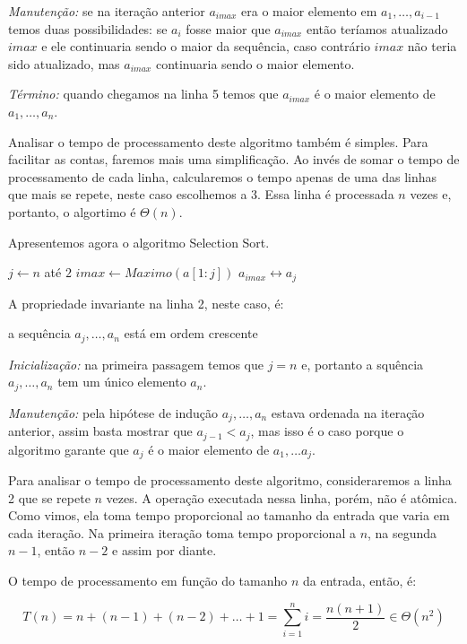   {\em Manutenção:} se na iteração anterior $a_{imax}$ era o maior elemento em $a_1, \dots, a_{i-1}$ temos duas possibilidades: se $a_i$ fosse maior que $a_{imax}$ então teríamos atualizado $imax$ e ele continuaria sendo o maior da sequência, caso contrário $imax$ não teria sido atualizado, mas $a_{imax}$ continuaria sendo o maior elemento.

  {\em Término:} quando chegamos na linha 5 temos que $a_{imax}$ é o maior elemento de $a_1, \dots, a_n$.

  Analisar o tempo de processamento deste algoritmo também é simples.
  Para facilitar as contas, faremos mais uma simplificação.
  Ao invés de somar o tempo de processamento de cada linha, calcularemos o tempo apenas de uma das linhas que mais se repete, neste caso escolhemos a 3.
  Essa linha é processada $n$ vezes e, portanto, o algortimo é $\Theta(n)$.

  Apresentemos agora o algoritmo Selection Sort.

  
  \begin{codebox}
\li \For $j \gets n$ até $2$
\li \Do $imax \gets Maximo(a[1:j])$
\li     \Then $a_{imax} \leftrightarrow a_j$
        \End
    \End
\End
  \end{codebox}

  A propriedade invariante na linha 2, neste caso, é:
  \begin{center}
    a sequência $a_j, \dots, a_n$ está em ordem crescente
  \end{center}

  {\em Inicialização:} na primeira passagem temos que $j=n$ e, portanto a squência $a_j, \dots, a_n$ tem um único elemento $a_n$.

  {\em Manutenção:} pela hipótese de indução $a_j, \dots, a_n$ estava ordenada na iteração anterior, assim basta mostrar que $a_{j-1} < a_j$, mas isso é o caso porque o algoritmo garante que $a_j$ é o maior elemento de $a_1, \dots a_j$.
  

  Para analisar o tempo de processamento deste algoritmo, consideraremos a linha 2 que se repete $n$ vezes.
  A operação executada nessa linha, porém, não é atômica.
  Como vimos, ela toma tempo proporcional ao tamanho da entrada que varia em cada iteração.
  Na primeira iteração toma tempo proporcional a $n$, na segunda $n-1$, então $n-2$ e assim por diante.

  O tempo de processamento em função do tamanho $n$ da entrada, então, é:

  \begin{displaymath}
    T(n) = n + (n-1) + (n-2) + \dots + 1 = \sum_{i=1}^{n}i = \frac{n(n+1)}{2} \in \Theta(n^2)
  \end{displaymath}

